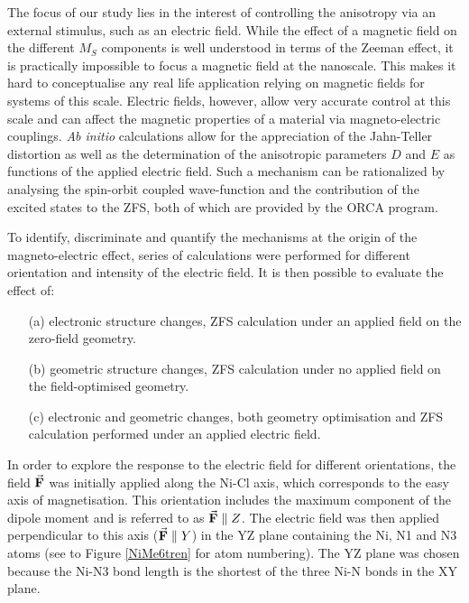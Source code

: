 \documentclass[12pt]{report}
\numberwithin{equation}{section}
\begin{document}
\par The focus of our study lies in the interest of controlling the anisotropy via an external stimulus, such as an electric field.
While the effect of a magnetic field on the different $M_S$ components is well understood in terms of the Zeeman effect, it is practically impossible to focus a magnetic field at the nanoscale.
This makes it hard to conceptualise any real life application relying on magnetic fields for systems of this scale.
Electric fields, however, allow very accurate control at this scale and can affect the magnetic properties of a material via magneto-electric couplings.
\textit{Ab initio} calculations allow for the appreciation of the Jahn-Teller distortion as well as the determination of the anisotropic parameters $D$ and $E$ as functions of the applied electric field.
Such a mechanism can be rationalized by analysing the spin-orbit coupled wave-function and the contribution of the excited states to the ZFS, both of which are provided by the ORCA program.
 
To identify, discriminate and quantify the mechanisms at the origin of the magneto-electric effect, series of calculations were performed for different orientation and intensity of the electric field.
It is then possible to evaluate the effect of:

\begin{itemize}
    \item[(a)] electronic structure changes, ZFS calculation under an applied field on the zero-field geometry.
    \item[(b)] geometric structure changes, ZFS calculation under no applied field on the field-optimised geometry.
    \item[(c)] electronic and geometric changes, both geometry optimisation and ZFS calculation performed under an applied electric field.
\end{itemize}

In order to explore the response to the electric field for different orientations, the field $\vec{\vb F}$ was initially applied along the Ni-Cl axis, which corresponds to the easy axis of magnetisation.
This orientation includes the maximum component of the dipole moment and is referred to as $\vec{\vb F}\parallel Z$.
The electric field was then applied perpendicular to this axis ($\vec{\vb F}\parallel Y$) in the YZ plane containing the Ni, N1 and N3 atoms (see to Figure \ref{NiMe6tren} for atom numbering). 
The YZ plane was chosen because the Ni-N3 bond length is the shortest of the three Ni-N bonds in the XY plane.
\end{document}
